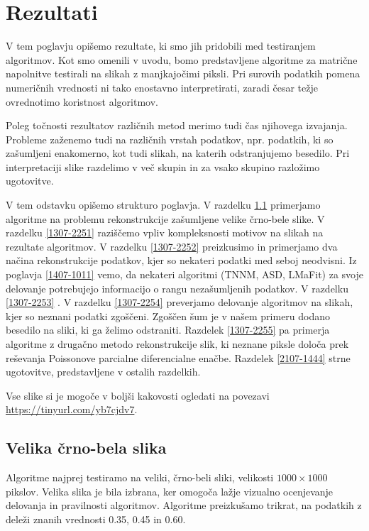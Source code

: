 \chapter{Rezultati}\label{1407-1012}

V tem poglavju opišemo rezultate, ki smo jih pridobili med testiranjem algoritmov. Kot smo omenili v uvodu, bomo predstavljene algoritme za matrične napolnitve testirali na slikah z manjkajočimi piksli. 
Pri surovih podatkih pomena numeričnih vrednosti ni tako enostavno interpretirati, zaradi česar težje ovrednotimo koristnost algoritmov.

Poleg točnosti rezultatov različnih metod merimo tudi čas njihovega izvajanja. Probleme zaženemo tudi na različnih vrstah podatkov, npr. podatkih, ki so zašumljeni enakomerno, kot tudi slikah, na katerih odstranjujemo besedilo.
Pri interpretaciji slike razdelimo v več skupin in za vsako skupino razložimo ugotovitve.

V tem odstavku opišemo strukturo poglavja.
V razdelku \ref{1307-2250} primerjamo algoritme na problemu rekonstrukcije zašumljene velike črno-bele slike. V razdelku \ref{1307-2251} raziščemo vpliv kompleksnosti motivov na slikah na rezultate algoritmov. V razdelku \ref{1307-2252} preizkusimo in primerjamo dva načina rekonstrukcije podatkov, kjer so nekateri podatki med seboj neodvisni. Iz poglavja \ref{1407-1011} vemo, da nekateri algoritmi (TNNM, ASD, LMaFit) za svoje delovanje potrebujejo informacijo o rangu nezašumljenih podatkov. V razdelku \ref{1307-2253} . V razdelku \ref{1307-2254} preverjamo delovanje algoritmov na slikah, kjer so neznani podatki zgoščeni.
Zgoščen šum je v našem primeru dodano besedilo na sliki, ki ga želimo odstraniti. Razdelek \ref{1307-2255} pa primerja algoritme z drugačno metodo rekonstrukcije slik, ki neznane piksle določa prek reševanja Poissonove parcialne diferencialne enačbe. Razdelek \ref{2107-1444} strne ugotovitve, predstavljene v ostalih razdelkih.


Vse slike si je mogoče v boljši kakovosti ogledati na povezavi \url{https://tinyurl.com/yb7cjdv7}.

\section{Velika črno-bela slika} \label{1307-2250}
Algoritme najprej testiramo na veliki, črno-beli sliki, velikosti $1000\times1000$ pikslov. Velika slika je bila izbrana, ker omogoča lažje vizualno ocenjevanje delovanja in pravilnosti algoritmov.
 Algoritme preizkušamo trikrat, na podatkih z deleži znanih vrednosti 0.35, 0.45  in 0.60.

\FloatBarrier

